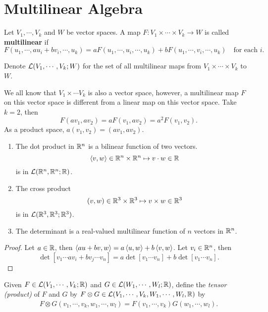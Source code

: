 \section{Multilinear Algebra}

\begin{definition}
Let $V_1, \cdots, V_k$ and $W$ be vector spaces. A map $F:V_1 \times \cdots \times V_k \to W$ is called \textbf{multilinear} if 
$$F(u_1, \cdots, au_i + bv_i, \cdots, u_k) = aF(u_1, \cdots, u_i, \cdots, u_k) + 
bF(u_1, \cdots, v_i, \cdots, u_k) \quad \text{for each }i. $$
\end{definition}
Denote $\mathcal{L}(V_1, \cdots, V_k;W)$ for the set of all multilinear maps from $V_1 \times \cdots \times V_k$ to $W$. 
\begin{remark}
    We all know that $V_1 \times \cdots V_k$ is also a vector space, however, a multilinear map $F$ on this vector space is different from a linear map on this vector space. Take $k=2$, then 
    $$F(av_1, av_2) = aF(v_1, av_2) = a^2 F(v_1, v_2). $$
    As a product space, $a(v_1, v_2) = (av_1, av_2)$. 
\end{remark}
\begin{example}
    \begin{enumerate}
    \item The dot product in $\mathbb{R}^n$ is a bilinear function of two vectors. 
    $$\left\langle v,w \right\rangle \in \mathbb{R}^n \times \mathbb{R}^n \mapsto v \cdot w \in \mathbb{R}$$ is in $\mathcal{L}(\mathbb{R}^n, \mathbb{R}^n; \mathbb{R})$.
    \item The cross product 
    $$(v,w) \in \mathbb{R}^3 \times \mathbb{R}^3 \mapsto v \times w \in \mathbb{R}^3 $$ is in $\mathcal{L}(\mathbb{R}^3, \mathbb{R}^3; \mathbb{R}^3)$.
    \item The determinant is a real-valued multilinear function of $n$ vectors in $\mathbb{R}^n$. 
    \end{enumerate}
\end{example}
\begin{proof}
    Let $a \in \mathbb{R}$, then $\left\langle au+bv, w \right\rangle = a\left\langle u, w \right\rangle + b\left\langle v, w \right\rangle$. Let $v_i \in \mathbb{R}^n$, then 
    $$\det [v_1 \cdots av_i+bv_j \cdots v_n ] = a\det[v_1 \cdots v_n] + b\det [v_1 \cdots v_n]. $$
\end{proof}
\begin{definition}
    Given $F \in \mathcal{L}(V_1, \cdots, V_k; \mathbb{R})$ and $G \in \mathcal{L}(W_1, \cdots, W_l; \mathbb{R})$, define the \textit{tensor (product)} of $F$ and $G$ by $F \otimes G \in \mathcal{L}(V_1, \cdots, V_k, W_1, \cdots, W_l, \mathbb{R})$ by 
    \begin{align*}
    F \otimes G(v_1, \cdots, v_k, w_1, \cdots, w_l) = F(v_1, \cdots, v_k)G(w_1, \cdots, w_l).
    \end{align*}
\end{definition}

